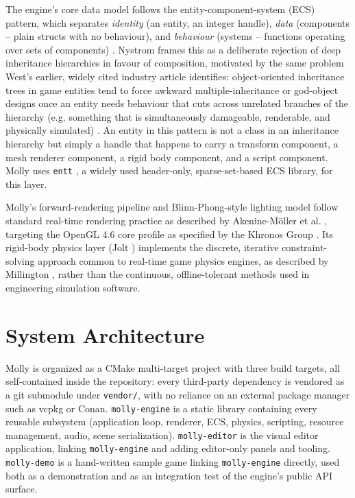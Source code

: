 \documentclass[conference]{IEEEtran}
\begin{document}
The engine's core data model follows the entity-component-system (ECS)
pattern, which separates \emph{identity} (an entity, an integer handle),
\emph{data} (components -- plain structs with no behaviour), and
\emph{behaviour} (systems -- functions operating over sets of
components) \cite{gregory-gea,nystrom-gpp}. Nystrom \cite{nystrom-gpp}
frames this as a deliberate rejection of deep inheritance hierarchies in
favour of composition, motivated by the same problem West's earlier,
widely cited industry article identifies: object-oriented inheritance
trees in game entities tend to force awkward multiple-inheritance or
god-object designs once an entity needs behaviour that cuts across
unrelated branches of the hierarchy (e.g. something that is simultaneously
damageable, renderable, and physically simulated) \cite{west-evolve}.
An entity in this pattern is not a class in an inheritance hierarchy but
simply a handle that happens to carry a transform component, a mesh
renderer component, a rigid body component, and a script component.
Molly uses \texttt{entt} \cite{entt}, a widely used header-only,
sparse-set-based ECS library, for this layer.

Molly's forward-rendering pipeline and Blinn-Phong-style lighting model
follow standard real-time rendering practice as described by
Akenine-M{\"o}ller et al. \cite{rtr4}, targeting the OpenGL 4.6 core
profile as specified by the Khronos Group \cite{opengl46}. Its rigid-body
physics layer (Jolt \cite{jolt}) implements the discrete, iterative
constraint-solving approach common to real-time game physics engines, as
described by Millington \cite{millington-physics}, rather than the
continuous, offline-tolerant methods used in engineering simulation
software.

\section{System Architecture}

Molly is organized as a CMake multi-target project with three build
targets, all self-contained inside the repository: every third-party
dependency is vendored as a git submodule under \texttt{vendor/}, with
no reliance on an external package manager such as vcpkg or Conan.
\texttt{molly-engine} is a static library containing every reusable
subsystem (application loop, renderer, ECS, physics, scripting, resource
management, audio, scene serialization). \texttt{molly-editor} is the
visual editor application, linking \texttt{molly-engine} and adding
editor-only panels and tooling. \texttt{molly-demo} is a hand-written
sample game linking \texttt{molly-engine} directly, used both as a
demonstration and as an integration test of the engine's public API
surface.
\end{document}
